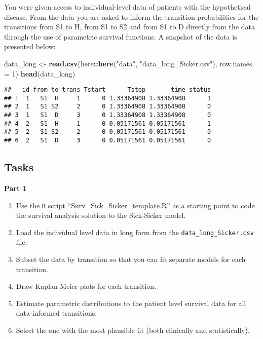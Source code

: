 \documentclass[
]{article}
\newenvironment{Shaded}{\begin{snugshade}}{\end{snugshade}}
\newcommand{\DataTypeTok}[1]{\textcolor[rgb]{0.13,0.29,0.53}{#1}}
\newcommand{\DecValTok}[1]{\textcolor[rgb]{0.00,0.00,0.81}{#1}}
\newcommand{\KeywordTok}[1]{\textcolor[rgb]{0.13,0.29,0.53}{\textbf{#1}}}
\newcommand{\NormalTok}[1]{#1}
\newcommand{\OperatorTok}[1]{\textcolor[rgb]{0.81,0.36,0.00}{\textbf{#1}}}
\newcommand{\StringTok}[1]{\textcolor[rgb]{0.31,0.60,0.02}{#1}}
\begin{document}
You were given access to individual-level data of patients with the
hypothetical disease. From the data you are asked to inform the
transition probabilities for the transitions from S1 to H, from S1 to S2
and from S1 to D directly from the data through the use of parametric
survival functions. A snapshot of the data is presented below:

\begin{Shaded}
\begin{Highlighting}[]
\NormalTok{data_long <-}\StringTok{ }\KeywordTok{read.csv}\NormalTok{(here}\OperatorTok{::}\KeywordTok{here}\NormalTok{(}\StringTok{"data"}\NormalTok{, }\StringTok{"data_long_Sicker.csv"}\NormalTok{), }\DataTypeTok{row.names =} \DecValTok{1}\NormalTok{)}
\KeywordTok{head}\NormalTok{(data_long)}
\end{Highlighting}
\end{Shaded}

\begin{verbatim}
##   id from to trans Tstart      Tstop       time status
## 1  1   S1  H     1      0 1.33364908 1.33364908      1
## 2  1   S1 S2     2      0 1.33364908 1.33364908      0
## 3  1   S1  D     3      0 1.33364908 1.33364908      0
## 4  2   S1  H     1      0 0.05171561 0.05171561      1
## 5  2   S1 S2     2      0 0.05171561 0.05171561      0
## 6  2   S1  D     3      0 0.05171561 0.05171561      0
\end{verbatim}

\hypertarget{tasks}{%
\subsection{Tasks}\label{tasks}}

\textbf{Part 1}

\begin{enumerate}
\def\labelenumi{\arabic{enumi}.}
\item
  Use the \texttt{R} script ``Surv\_Sick\_Sicker\_template.R'' as a
  starting point to code the survival analysis solution to the
  Sick-Sicker model.
\item
  Load the individual level data in long form from the
  \texttt{data\_long\_Sicker.csv} file.
\item
  Subset the data by transition so that you can fit separate models for
  each transition.
\item
  Draw Kaplan Meier plots for each transition.
\item
  Estimate parametric distributions to the patient level survival data
  for all data-informed transitions.
\item
  Select the one with the most plausible fit (both clinically and
  statistically).
\end{enumerate}
\end{document}
